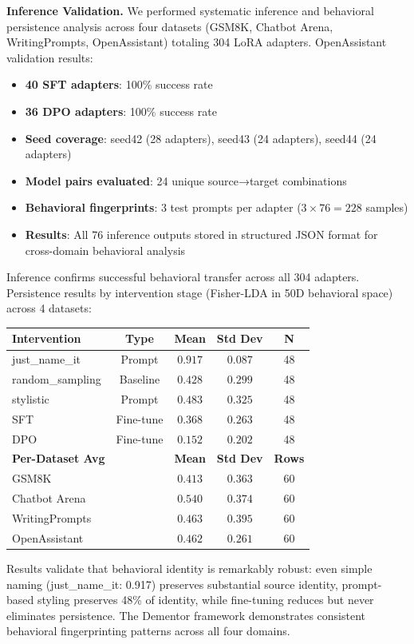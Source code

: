 \documentclass{article}
\begin{document}
\textbf{Inference Validation.} We performed systematic inference and behavioral persistence analysis across four datasets (GSM8K, Chatbot Arena, WritingPrompts, OpenAssistant) totaling 304 LoRA adapters. OpenAssistant validation results:
\begin{itemize} 
  \item \textbf{40 SFT adapters}: 100\% success rate
  \item \textbf{36 DPO adapters}: 100\% success rate
  \item \textbf{Seed coverage}: seed42 (28 adapters), seed43 (24 adapters), seed44 (24 adapters)
  \item \textbf{Model pairs evaluated}: 24 unique source→target combinations
  \item \textbf{Behavioral fingerprints}: 3 test prompts per adapter ($3 \times 76 = 228$ samples)
  \item \textbf{Results}: All 76 inference outputs stored in structured JSON format for cross-domain behavioral analysis
\end{itemize}
Inference confirms successful behavioral transfer across all 304 adapters. Persistence results by intervention stage (Fisher-LDA in 50D behavioral space) across 4 datasets:
\begin{table}[h]
\centering
\begin{tabular}{lcccc}
\toprule
\textbf{Intervention} & \textbf{Type} & \textbf{Mean} & \textbf{Std Dev} & \textbf{N} \\
\midrule
just\_name\_it & Prompt & $0.917$ & $0.087$ & 48 \\
random\_sampling & Baseline & $0.428$ & $0.299$ & 48 \\
stylistic & Prompt & $0.483$ & $0.325$ & 48 \\
SFT & Fine-tune & $0.368$ & $0.263$ & 48 \\
DPO & Fine-tune & $0.152$ & $0.202$ & 48 \\
\midrule
\textbf{Per-Dataset Avg} & & \textbf{Mean} & \textbf{Std Dev} & \textbf{Rows} \\
\midrule
GSM8K & & $0.413$ & $0.363$ & 60 \\
Chatbot Arena & & $0.540$ & $0.374$ & 60 \\
WritingPrompts & & $0.463$ & $0.395$ & 60 \\
OpenAssistant & & $0.462$ & $0.261$ & 60 \\
\bottomrule
\end{tabular}
\label{tab:persistence}
\end{table}
Results validate that behavioral identity is remarkably robust: even simple naming (just\_name\_it: 0.917) preserves substantial source identity, prompt-based styling preserves 48\% of identity, while fine-tuning reduces but never eliminates persistence. The Dementor framework demonstrates consistent behavioral fingerprinting patterns across all four domains.
\end{document}
